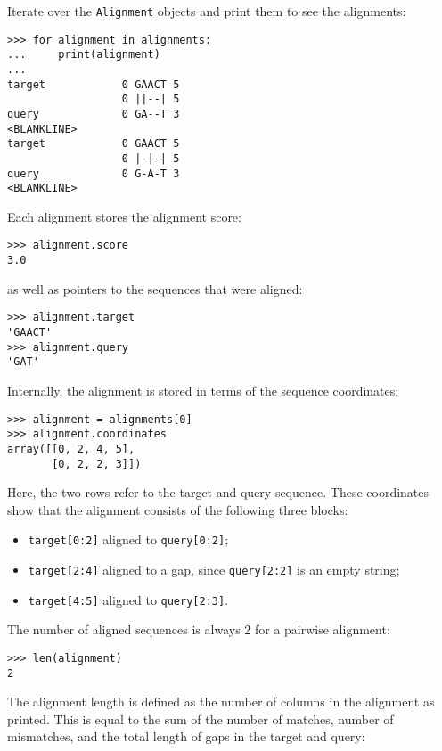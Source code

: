 Iterate over the \verb+Alignment+ objects and print them to see the alignments:
\begin{verbatim}
>>> for alignment in alignments:
...     print(alignment)
...
target            0 GAACT 5
                  0 ||--| 5
query             0 GA--T 3
<BLANKLINE>
target            0 GAACT 5
                  0 |-|-| 5
query             0 G-A-T 3
<BLANKLINE>
\end{verbatim}

Each alignment stores the alignment score:

\begin{verbatim}
>>> alignment.score
3.0
\end{verbatim}
as well as pointers to the sequences that were aligned:

\begin{verbatim}
>>> alignment.target
'GAACT'
>>> alignment.query
'GAT'
\end{verbatim}

Internally, the alignment is stored in terms of the sequence coordinates:
\begin{verbatim}
>>> alignment = alignments[0]
>>> alignment.coordinates
array([[0, 2, 4, 5],
       [0, 2, 2, 3]])
\end{verbatim}

Here, the two rows refer to the target and query sequence. These coordinates show that the alignment consists of the following three blocks:

\begin{itemize}
\item \verb+target[0:2]+ aligned to \verb+query[0:2]+;
\item \verb+target[2:4]+ aligned to a gap, since \verb+query[2:2]+ is an empty string;
\item \verb+target[4:5]+ aligned to \verb+query[2:3]+.
\end{itemize}

The number of aligned sequences is always 2 for a pairwise alignment:

\begin{verbatim}
>>> len(alignment)
2
\end{verbatim}

The alignment length is defined as the number of columns in the alignment as
printed. This is equal to the sum of the number of matches, number of
mismatches, and the total length of gaps in the target and query:

